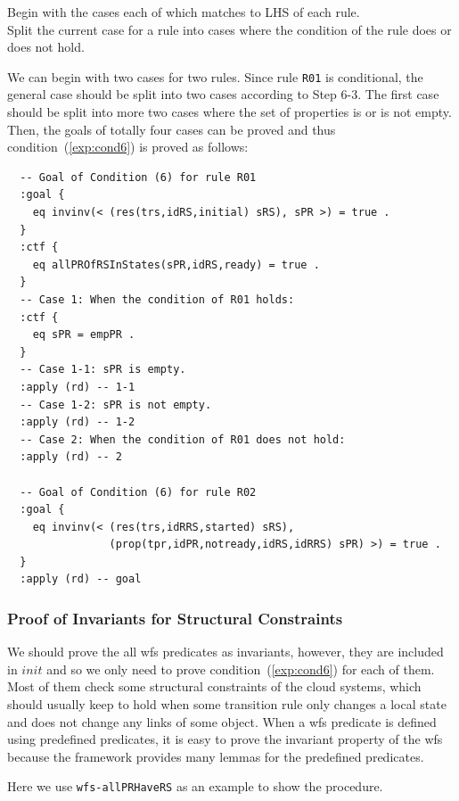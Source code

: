 \documentclass[12pt]{report}
\begin{document}
 Begin with the cases each of which matches to
LHS of each rule. \\ 
 Split the current case for a rule into
cases where the condition of the rule does or does not hold. 

We can begin with two cases for two rules. Since rule {\tt R01} is
conditional, the general case should be split into two cases according
to Step 6-3. The first case should be split into more two cases
where the set of properties is or is not empty.
Then, the goals of totally four cases can be proved and
thus condition~(\ref{exp:cond6}) is proved as follows:
\small
\begin{verbatim}
  -- Goal of Condition (6) for rule R01
  :goal {
    eq invinv(< (res(trs,idRS,initial) sRS), sPR >) = true .
  }
  :ctf {
    eq allPROfRSInStates(sPR,idRS,ready) = true .
  }
  -- Case 1: When the condition of R01 holds:
  :ctf {
    eq sPR = empPR .
  }
  -- Case 1-1: sPR is empty.
  :apply (rd) -- 1-1
  -- Case 1-2: sPR is not empty.
  :apply (rd) -- 1-2
  -- Case 2: When the condition of R01 does not hold:
  :apply (rd) -- 2

  -- Goal of Condition (6) for rule R02
  :goal {
    eq invinv(< (res(trs,idRRS,started) sRS),
                (prop(tpr,idPR,notready,idRS,idRRS) sPR) >) = true .
  }
  :apply (rd) -- goal
\end{verbatim}
\normalsize

\subsubsection*{Proof of Invariants for Structural Constraints}
We should prove the all wfs predicates as invariants, however, they are
included in $init$ and so we only need to prove
condition~(\ref{exp:cond6}) for each of them. Most of them check some
structural constraints of the cloud systems, which should usually keep
to hold when some transition rule only changes a local state and
does not change any links of some
object. When a wfs predicate is defined using predefined predicates, it
is easy to prove the invariant property of the wfs because the framework
provides many lemmas for the predefined predicates.

Here we use {\tt wfs-allPRHaveRS} as an example to show the procedure.\\
\end{document}

